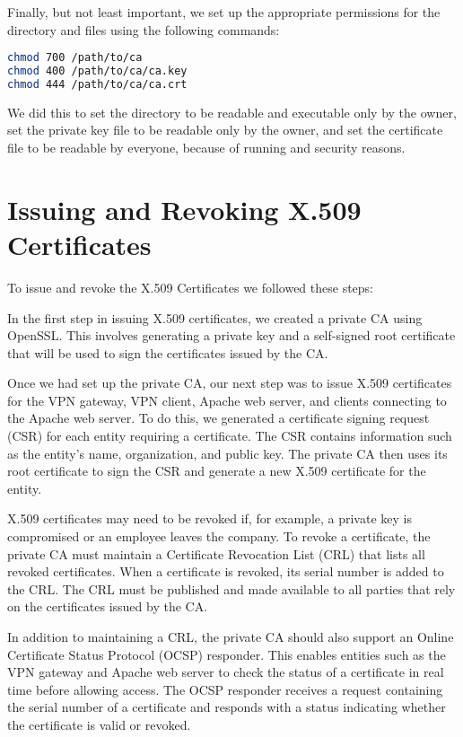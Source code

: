 \documentclass[12pt]{article}
\begin{document}
Finally, but not least important, we set up the appropriate permissions for the directory and files using the following commands:

\begin{lstlisting}[language=bash]
chmod 700 /path/to/ca
chmod 400 /path/to/ca/ca.key
chmod 444 /path/to/ca/ca.crt
\end{lstlisting}

We did this to set the directory to be readable and executable only by the owner, set the private key file to be readable only by the owner, and set the certificate file to be readable by everyone, because of running and security reasons.

\section{Issuing and Revoking X.509 Certificates}

To issue and revoke the X.509 Certificates we followed these steps:

In the first step in issuing X.509 certificates, we created a private CA using OpenSSL. This involves generating a private key and a self-signed root certificate that will be used to sign the certificates issued by the CA.

Once we had set up the private CA, our next step was to issue X.509 certificates for the VPN gateway, VPN client, Apache web server, and clients connecting to the Apache web server. To do this, we generated a certificate signing request (CSR) for each entity requiring a certificate. The CSR contains information such as the entity's name, organization, and public key. The private CA then uses its root certificate to sign the CSR and generate a new X.509 certificate for the entity.

X.509 certificates may need to be revoked if, for example, a private key is compromised or an employee leaves the company. To revoke a certificate, the private CA must maintain a Certificate Revocation List (CRL) that lists all revoked certificates. When a certificate is revoked, its serial number is added to the CRL. The CRL must be published and made available to all parties that rely on the certificates issued by the CA.

In addition to maintaining a CRL, the private CA should also support an Online Certificate Status Protocol (OCSP) responder. This enables entities such as the VPN gateway and Apache web server to check the status of a certificate in real time before allowing access. The OCSP responder receives a request containing the serial number of a certificate and responds with a status indicating whether the certificate is valid or revoked.
\end{document}
